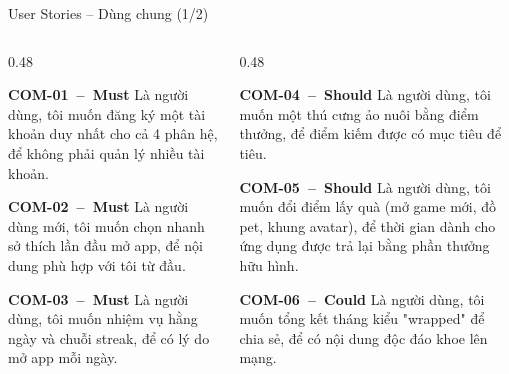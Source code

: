 \documentclass[aspectratio=169]{beamer}
\begin{document}
\begin{frame}{User Stories -- Dùng chung (1/2)}
  \begin{columns}
    \begin{column}{0.48\textwidth}
      \begin{block}{\scriptsize\bfseries COM-01~--~Must}
        {\tiny Là người dùng, tôi muốn đăng ký một tài khoản duy nhất cho cả 4 phân hệ, để không phải quản lý nhiều tài khoản.}
      \end{block}
      \begin{block}{\scriptsize\bfseries COM-02~--~Must}
        {\tiny Là người dùng mới, tôi muốn chọn nhanh sở thích lần đầu mở app, để nội dung phù hợp với tôi từ đầu.}
      \end{block}
      \begin{block}{\scriptsize\bfseries COM-03~--~Must}
        {\tiny Là người dùng, tôi muốn nhiệm vụ hằng ngày và chuỗi streak, để có lý do mở app mỗi ngày.}
      \end{block}
    \end{column}
    \begin{column}{0.48\textwidth}
      \begin{block}{\scriptsize\bfseries COM-04~--~Should}
        {\tiny Là người dùng, tôi muốn một thú cưng ảo nuôi bằng điểm thưởng, để điểm kiếm được có mục tiêu để tiêu.}
      \end{block}
      \begin{block}{\scriptsize\bfseries COM-05~--~Should}
        {\tiny Là người dùng, tôi muốn đổi điểm lấy quà (mở game mới, đồ pet, khung avatar), để thời gian dành cho ứng dụng được trả lại bằng phần thưởng hữu hình.}
      \end{block}
      \begin{block}{\scriptsize\bfseries COM-06~--~Could}
        {\tiny Là người dùng, tôi muốn tổng kết tháng kiểu "wrapped" để chia sẻ, để có nội dung độc đáo khoe lên mạng.}
      \end{block}
    \end{column}
  \end{columns}
\end{frame}
\end{document}
